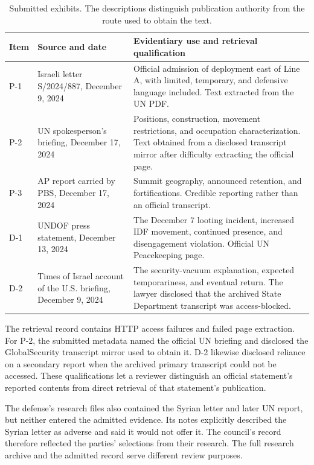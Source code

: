 \documentclass[11pt]{article}
\begin{document}
\begin{table}[htbp]
\centering
\small
\caption{Submitted exhibits.  The descriptions distinguish publication authority from the route used to obtain the text.}
\label{tab:evidence}
\begin{tabularx}{\textwidth}{@{}L{0.055\textwidth}L{0.30\textwidth}Y@{}}
\toprule
Item & Source and date & Evidentiary use and retrieval qualification \\
\midrule
P-1 & Israeli letter S/2024/887, December 9, 2024 & Official admission of deployment east of Line A, with limited, temporary, and defensive language included.  Text extracted from the UN PDF. \\
P-2 & UN spokesperson's briefing, December 17, 2024 & Positions, construction, movement restrictions, and occupation characterization.  Text obtained from a disclosed transcript mirror after difficulty extracting the official page. \\
P-3 & AP report carried by PBS, December 17, 2024 & Summit geography, announced retention, and fortifications.  Credible reporting rather than an official transcript. \\
D-1 & UNDOF press statement, December 13, 2024 & The December 7 looting incident, increased IDF movement, continued presence, and disengagement violation.  Official UN Peacekeeping page. \\
D-2 & Times of Israel account of the U.S. briefing, December 9, 2024 & The security-vacuum explanation, expected temporariness, and eventual return.  The lawyer disclosed that the archived State Department transcript was access-blocked. \\
\bottomrule
\end{tabularx}
\end{table}

The retrieval record contains HTTP access failures and failed page extraction.  For P-2, the submitted metadata named the official UN briefing and disclosed the GlobalSecurity transcript mirror used to obtain it.  D-2 likewise disclosed reliance on a secondary report when the archived primary transcript could not be accessed.  These qualifications let a reviewer distinguish an official statement's reported contents from direct retrieval of that statement's publication.

The defense's research files also contained the Syrian letter and later UN report, but neither entered the admitted evidence.  Its notes explicitly described the Syrian letter as adverse and said it would not offer it.  The council's record therefore reflected the parties' selections from their research.  The full research archive and the admitted record serve different review purposes.
\end{document}
